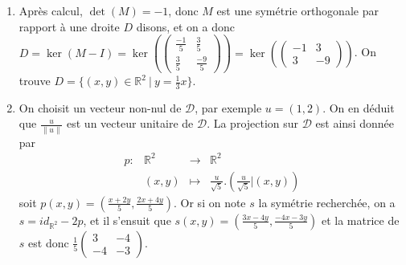 \documentclass[a4paper, 10pt]{article}
\theoremstyle{plain}
\newcommand{\R}{\mathbb{R}}
\begin{document}
\begin{enumerate}
\item 
Après calcul, 
$\det(M)=-1$, donc $M$ est une symétrie orthogonale par rapport à une droite $D$ disons, et 
on a donc 
$D = \ker (M-I) = \ker 
(\begin{pmatrix}
\frac{-1}{5} & \frac{3}{5} \\[3pt]
\frac{3}{5}  & \frac{-9}{5}
\end{pmatrix}  )
 = \ker (
 \begin{pmatrix}
 -1&3\\3&-9
 \end{pmatrix})$.
 On trouve 
 $D= \{(x,y)\in \R^2 \ \big| \ y= \frac{1}{3} x \}$.

\item 
On choisit un vecteur non-nul de $\mathcal{D}$, par exemple 
$u=(1,2)$. On en déduit 
que $\frac{u}{\|u\|}$ est un vecteur unitaire de $\mathcal{D}$.
La projection sur 
$\mathcal{D}$ est ainsi donnée par 
\[
\begin{array}{lccc}
p : & \R^2 	& \to     & \R^2 \\
    & (x,y) & \mapsto & \frac{u}{\sqrt{5}}. (\frac{u}{\sqrt{5}} | (x,y) )
\end{array}
\]
soit 
$p(x,y) = ( \frac{x+2y}{5} , \frac{2x+4y}{5} )$.
Or 
si on note $s$ la symétrie recherchée, on a 
$s = id_{\R^2} -2p$, et il s'ensuit que 
$s(x,y) = ( \frac{3x-4y}{5} , \frac{-4x-3y}{5} )$
et la matrice de $s$ est donc 
$\frac{1}{5}
\begin{pmatrix}
3&-4\\-4&-3
\end{pmatrix}$.

\end{enumerate}
\end{document}

